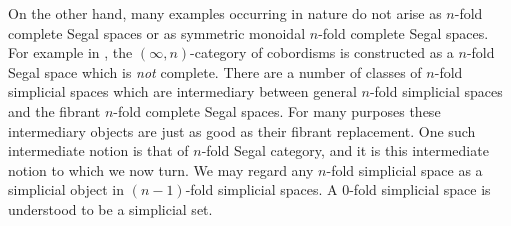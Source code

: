 \documentclass{amsart}
\begin{document}
On the other hand, many examples occurring { in nature} do not arise as $n$-fold complete Segal spaces or as symmetric monoidal $n$-fold complete Segal spaces. For example in \cite{Lurie}, the $(\infty, n)$-category of cobordisms is constructed as a $n$-fold Segal space which is {\em not} complete. There are a number of classes of $n$-fold simplicial spaces which are intermediary between general $n$-fold simplicial spaces and the fibrant $n$-fold complete Segal spaces. For many purposes these intermediary objects are just as good as their fibrant replacement. One such intermediate notion is that of $n$-fold Segal category, and it is this intermediate notion to which we now turn. 
%
We may regard any $n$-fold simplicial space as a simplicial object in $(n-1)$-fold simplicial spaces. A $0$-fold simplicial space is understood to be a simplicial set. 
\end{document}

